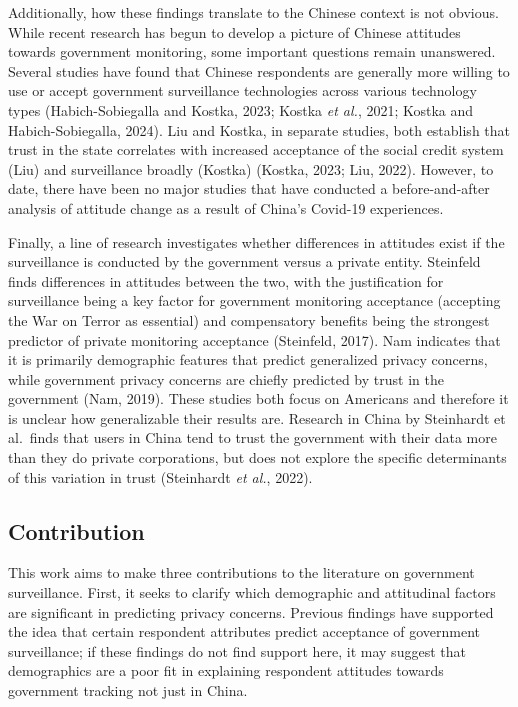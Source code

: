 \documentclass[
  letterpaper,
  DIV=11,
  numbers=noendperiod]{scrartcl}
\begin{document}
Additionally, how these findings translate to the Chinese context is not
obvious. While recent research has begun to develop a picture of Chinese
attitudes towards government monitoring, some important questions remain
unanswered. Several studies have found that Chinese respondents are
generally more willing to use or accept government surveillance
technologies across various technology types (Habich-Sobiegalla and
Kostka, 2023; Kostka \emph{et al.}, 2021; Kostka and Habich-Sobiegalla,
2024). Liu and Kostka, in separate studies, both establish that trust in
the state correlates with increased acceptance of the social credit
system (Liu) and surveillance broadly (Kostka) (Kostka, 2023; Liu,
2022). However, to date, there have been no major studies that have
conducted a before-and-after analysis of attitude change as a result of
China's Covid-19 experiences.

Finally, a line of research investigates whether differences in
attitudes exist if the surveillance is conducted by the government
versus a private entity. Steinfeld finds differences in attitudes
between the two, with the justification for surveillance being a key
factor for government monitoring acceptance (accepting the War on Terror
as essential) and compensatory benefits being the strongest predictor of
private monitoring acceptance (Steinfeld, 2017). Nam indicates that it
is primarily demographic features that predict generalized privacy
concerns, while government privacy concerns are chiefly predicted by
trust in the government (Nam, 2019). These studies both focus on
Americans and therefore it is unclear how generalizable their results
are. Research in China by Steinhardt et al.~finds that users in China
tend to trust the government with their data more than they do private
corporations, but does not explore the specific determinants of this
variation in trust (Steinhardt \emph{et al.}, 2022).

\subsection{Contribution}\label{contribution}

This work aims to make three contributions to the literature on
government surveillance. First, it seeks to clarify which demographic
and attitudinal factors are significant in predicting privacy concerns.
Previous findings have supported the idea that certain respondent
attributes predict acceptance of government surveillance; if these
findings do not find support here, it may suggest that demographics are
a poor fit in explaining respondent attitudes towards government
tracking not just in China.
\end{document}
